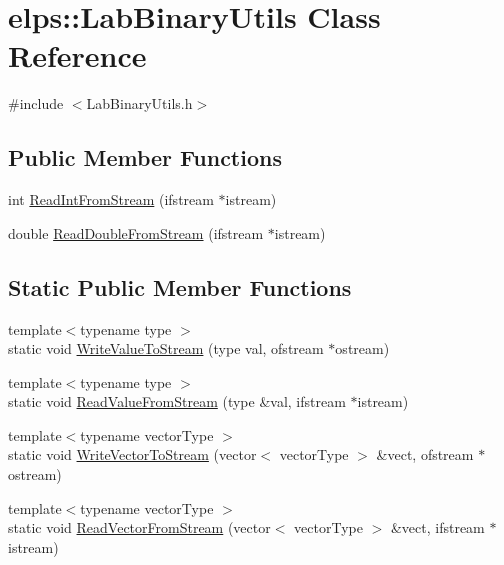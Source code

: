 \hypertarget{classelps_1_1_lab_binary_utils}{\section{elps\-:\-:Lab\-Binary\-Utils Class Reference}
\label{classelps_1_1_lab_binary_utils}
}


{\ttfamily \#include $<$Lab\-Binary\-Utils.\-h$>$}

\subsection*{Public Member Functions}
\begin{DoxyCompactItemize}
\item 
int \hyperlink{classelps_1_1_lab_binary_utils_a8106920687a59f85c301514d3a60fc32}{Read\-Int\-From\-Stream} (ifstream $\ast$istream)
\item 
double \hyperlink{classelps_1_1_lab_binary_utils_a086e10166668484dbc4f8ea5677dff58}{Read\-Double\-From\-Stream} (ifstream $\ast$istream)
\end{DoxyCompactItemize}
\subsection*{Static Public Member Functions}
\begin{DoxyCompactItemize}
\item 
{\footnotesize template$<$typename type $>$ }\\static void \hyperlink{classelps_1_1_lab_binary_utils_a2c5e61ad5108cbaf5ac2e757ab5d3475}{Write\-Value\-To\-Stream} (type val, ofstream $\ast$ostream)
\item 
{\footnotesize template$<$typename type $>$ }\\static void \hyperlink{classelps_1_1_lab_binary_utils_aacefd0e197978750669d1dde4634ba5c}{Read\-Value\-From\-Stream} (type \&val, ifstream $\ast$istream)
\item 
{\footnotesize template$<$typename vector\-Type $>$ }\\static void \hyperlink{classelps_1_1_lab_binary_utils_a0df99bc2f26dd144c1a598c4bc943ca7}{Write\-Vector\-To\-Stream} (vector$<$ vector\-Type $>$ \&vect, ofstream $\ast$ostream)
\item 
{\footnotesize template$<$typename vector\-Type $>$ }\\static void \hyperlink{classelps_1_1_lab_binary_utils_ad681309551b853645cb6aea77126a871}{Read\-Vector\-From\-Stream} (vector$<$ vector\-Type $>$ \&vect, ifstream $\ast$istream)
\end{DoxyCompactItemize}


